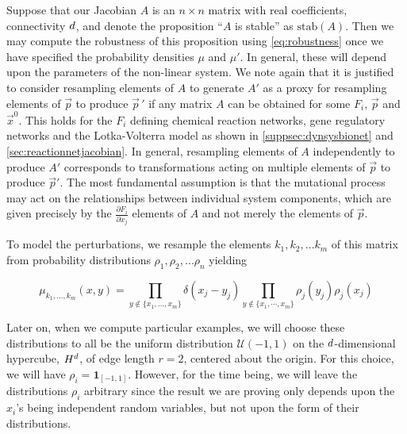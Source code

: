 Suppose that our Jacobian $A$ is an $n \times n$ matrix with real coefficients, connectivity $d$, and denote the proposition ``$A$ is stable'' as $\mathrm{stab}(A)$.  Then we may compute the robustness of this proposition using \ref{eq:robustness} once we have specified the probability densities $\mu$ and $\mu'$.  In general, these will depend upon the parameters of the non-linear system. We note again that it is justified to consider resampling elements of $A$ to generate $A'$ as a proxy for resampling elements of $\vec{p}$ to produce $\vec{p}\,'$ if any matrix $A$ can be obtained for some $F_i$, $\vec{p}$ and $\vec{x}^0$. This holds for the $F_i$ defining chemical reaction networks, gene regulatory networks and the Lotka-Volterra model as shown in \ref{suppsec:dynsysbionet} and \ref{sec:reactionnetjacobian}.
In general, resampling elements of $A$ independently to produce $A'$ corresponds to transformations acting on multiple elements of $\vec{p}$ to produce $\vec{p}'$. The most fundamental assumption is that the mutational process may act on the relationships between individual system components, which are given precisely by the $\frac{\partial F_i}{\partial x_j}$ elements of $A$ and not merely the elements of $\vec{p}$.

To model the perturbations, we resample the elements $k_1, k_2, \ldots k_m$ of this matrix from probability distributions $\rho_1, \rho_2, \ldots \rho_n$ yielding
\begin{widetext}
$$
\mu_{k_1,\ldots,k_m}(x,y) = \prod_{y \notin \{x_1, \ldots, x_m\} } \delta(x_j-y_j) \prod_{y \notin \{x_1,\cdots,x_m\}} \rho_j (y_j) \rho_j (x_j)
$$
\end{widetext}
Later on, when we compute particular examples, we will choose these distributions to all be the uniform distribution $\mathcal{U}(-1,1)$ on the $d$-dimensional hypercube, $H^d$, of edge length $r=2$, centered about the origin.  For this choice, we will have $\rho_i = \mathbf{1}_{[-1,1]}$.  However, for the time being, we will leave the distributions $\rho_i$ arbitrary since the result we are proving only depends upon the $x_i$'s being independent random variables, but not upon the form of their distributions.


